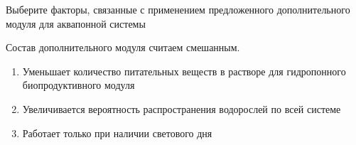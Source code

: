 
Выберите факторы, связанные с применением предложенного дополнительного модуля для аквапонной системы

Состав дополнительного модуля считаем смешанным. 

\begin{enumerate}
    \item Уменьшает количество питательных веществ в растворе для гидропонного биопродуктивного модуля
    \item Увеличивается вероятность распространения водорослей по всей системе
    \item Работает только при наличии светового дня
\end{enumerate}

